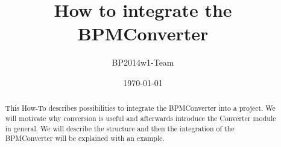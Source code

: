 \documentclass[11pt]{scrartcl}
\title{How to integrate the BPMConverter}
\author{BP2014w1-Team}
\date{\today}
\begin{document}
\maketitle

\begin{abstract}

This How-To describes possibilities to integrate the BPMConverter into a project.
We will motivate why conversion is useful and afterwards introduce the Converter module in general.
We will describe the structure and then the integration of the BPMConverter will be explained with an example.

\end{abstract}






\end{document}
